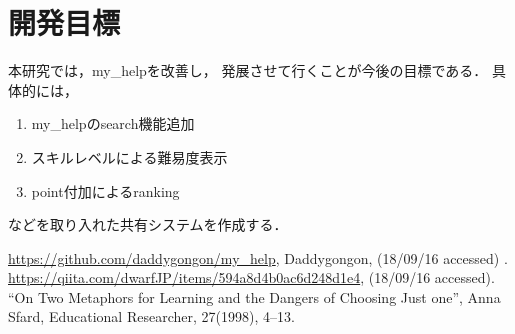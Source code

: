 \documentclass[a4j,twocolumn,uplatex]{jsarticle}
\begin{document}
\begin{comment}
\begin{verbatim}
> my_Help list emacs -c
- emacsのキーバインド
- 
特殊キー操作
-   C-f, controlキーを押しながら    'f'
-   M-f, escキーを押した後一度離して'f'
-     操作の中断C-g, 操作の取り消し(Undo) C-x u
-----
cursor
- C-f, move Forwrard,    前or右へ
- C-b, move Backwrard,   後or左へ
．．．
\end{verbatim}


my\_helpはshell上のdirectory位置によらずどこからでも
呼び出せて，applicationを切り替えることなく参照できる．
また，編集が手軽にできることから
自分独自のメモを取ることによって，
記憶の定着を促すツールとしての活用を意図している．
\end{comment}


\section{開発目標}
本研究では，my\_helpを改善し，
発展させて行くことが今後の目標である．
具体的には，
\begin{enumerate}
\item my\_helpのsearch機能追加
\item スキルレベルによる難易度表示
\item point付加によるranking
\end{enumerate}
などを取り入れた共有システムを作成する．

{\small\setlength\baselineskip{10pt}	%
\begin{thebibliography}{9}
\url{https://github.com/daddygongon/my_help}, Daddygongon, (18/09/16 accessed) .
 \url{https://qiita.com/dwarfJP/items/594a8d4b0ac6d248d1e4}, (18/09/16 accessed).
“On Two Metaphors for Learning and the Dangers of Choosing Just one”, Anna
Sfard, Educational Researcher, 27(1998), 4–13.
\end{thebibliography}
}
\end{document}
